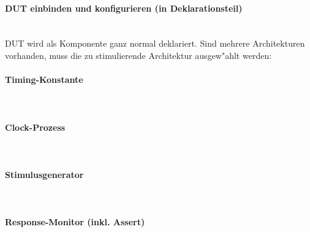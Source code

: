 			\paragraph{DUT einbinden und konfigurieren (in Deklarationsteil)} $\;$ \\
				DUT wird als Komponente ganz normal deklariert.
				Sind mehrere Architekturen vorhanden, muss die zu stimulierende 	
				Architektur ausgew"ahlt werden:
				
			\begin{multicols}{2}
				\paragraph{Timing-Konstante} $\;$ \\
					
				\paragraph{Clock-Prozess} $\;$ \\
					
				\paragraph{Stimulusgenerator} $\;$ \\
					
			\end{multicols}	

			\paragraph{Response-Monitor (inkl. Assert)} $\;$ \\
				
			
